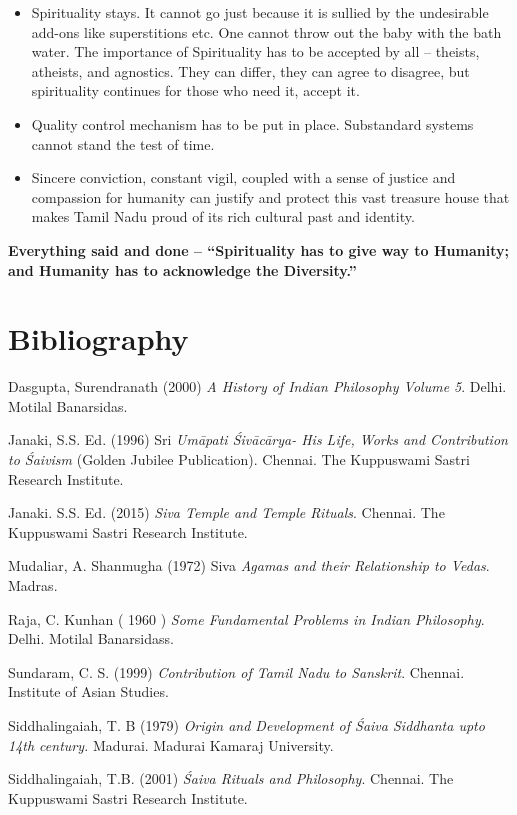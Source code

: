 \begin{itemize}
\item Spirituality stays. It cannot go just because it is sullied by the undesirable add-ons like superstitions etc. One cannot throw out the baby with the bath water. The importance of Spirituality has to be accepted by all – theists, atheists, and agnostics. They can differ, they can agree to disagree, but spirituality continues for those who need it, accept it.

 \item Quality control mechanism has to be put in place. Substandard systems cannot stand the test of time.

 \item Sincere conviction, constant vigil, coupled with a sense of justice and compassion for humanity can justify and protect this vast treasure house that makes Tamil Nadu proud of its rich cultural past and identity.

\end{itemize}

\textbf{Everything said and done – “Spirituality has to give way to Humanity; and Humanity has to acknowledge the Diversity.”}

\newpage


\section*{Bibliography}

\begin{thebibliography}{99}
 Dasgupta, Surendranath (2000) \textit{A History of Indian Philosophy Volume 5}. Delhi. Motilal Banarsidas.

  Janaki, S.S. Ed. (1996) Sri \textit{Umāpati Śivācārya- His Life, Works and Contribution to Śaivism} (Golden Jubilee Publication). Chennai. The Kuppuswami Sastri Research Institute.

  Janaki. S.S. Ed. (2015) \textit{Siva Temple and Temple Rituals}. Chennai. The Kuppuswami Sastri Research Institute.

  Mudaliar, A. Shanmugha (1972) Siva \textit{Agamas and their Relationship to Vedas}. Madras.

  Raja, C. Kunhan ( 1960 ) \textit{Some Fundamental Problems in Indian Philosophy}. Delhi. Motilal Banarsidass.

  Sundaram, C. S. (1999) \textit{Contribution of Tamil Nadu to Sanskrit}. Chennai. Institute of Asian Studies.

  Siddhalingaiah, T. B (1979) \textit{Origin and Development of Śaiva Siddhanta upto 14th century.} Madurai. Madurai Kamaraj University.

  Siddhalingaiah, T.B. (2001) \textit{Śaiva Rituals and Philosophy}. Chennai. The Kuppuswami Sastri Research Institute.

 \end{thebibliography}


